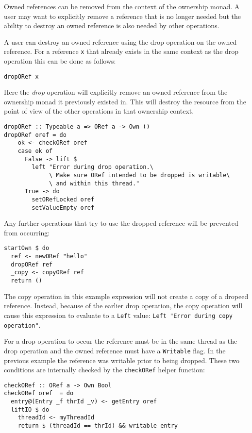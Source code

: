 \documentclass[onehalf,11pt]{beavtex}
\begin{document}
Owned references can be removed from the context of the ownership monad.
A user may want to explicitly remove a reference that is no longer needed but
the ability to destroy an owned reference is also needed by other operations.

A user can destroy an owned reference using the drop operation on the owned
reference. For a reference \texttt{x} that already exists in the same context
as the drop operation this can be done as follows:

\begin{verbatim}
dropORef x
\end{verbatim}

Here the \textit{drop} operation will explicitly remove an owned reference from
the ownership monad it previously existed in.
This will destroy the resource from the point of view of the other operations
in that ownership context.

\begin{verbatim}
dropORef :: Typeable a => ORef a -> Own ()
dropORef oref = do
    ok <- checkORef oref
    case ok of
      False -> lift $
        left "Error during drop operation.\
             \ Make sure ORef intended to be dropped is writable\
             \ and within this thread."
      True -> do
        setORefLocked oref
        setValueEmpty oref
\end{verbatim}

Any further operations that try to use the dropped reference will be prevented
from occurring:

\begin{lstlisting}
startOwn $ do
  ref <- newORef "hello"
  dropORef ref
  _copy <- copyORef ref
  return ()
\end{lstlisting}

The copy operation in this example expression will not create a copy of a
dropeed reference.
Instead, because of the earlier drop operation, the copy operation will cause
this expression to evaluate to a \texttt{Left}
value: \texttt{Left "Error during copy operation"}. 

For a drop operation to occur the reference must be in the same thread as the
drop operation and the owned reference must have a \texttt{Writable} flag.
In the previous example the reference was writable prior to being dropped.
These two conditions are internally checked by the \texttt{checkORef} helper
function:

\begin{verbatim}
checkORef :: ORef a -> Own Bool
checkORef oref  = do
  entry@(Entry _f thrId _v) <- getEntry oref
  liftIO $ do
    threadId <- myThreadId
    return $ (threadId == thrId) && writable entry
\end{verbatim}
\end{document}
